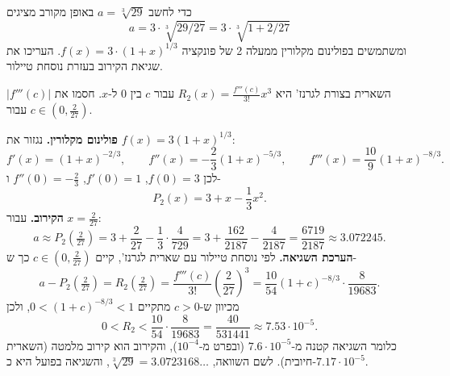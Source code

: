
\begin{question}
כדי לחשב $a=\sqrt[3]{29}$ באופן מקורב מציגים
\[ a=3\cdot\sqrt[3]{29/27}=3\cdot\sqrt[3]{1+2/27} \]
ומשתמשים בפולינום מקלורין ממעלה 2 של פונקציה $f(x)=3\cdot(1+x)^{1/3}$. העריכו את שגיאת הקירוב בעזרת נוסחת טיילור.
\end{question}

\begin{hint}
השארית בצורת לגרנז' היא $R_2(x)=\frac{f'''(c)}{3!}x^3$ עבור $c$ בין $0$ ל-$x$. חסמו את $|f'''(c)|$ עבור $c\in(0,\frac2{27})$.
\end{hint}

\begin{solution}
\textbf{פולינום מקלורין.} נגזור את $f(x)=3(1+x)^{1/3}$:
\[ f'(x)=(1+x)^{-2/3},\qquad f''(x)=-\frac23(1+x)^{-5/3},\qquad f'''(x)=\frac{10}{9}(1+x)^{-8/3}. \]
לכן $f(0)=3$, $f'(0)=1$, $f''(0)=-\frac23$ ו-
\[ P_2(x)=3+x-\frac13x^2. \]
\textbf{הקירוב.} עבור $x=\frac2{27}$:
\[ a\approx P_2\!\left(\tfrac2{27}\right)=3+\frac2{27}-\frac13\cdot\frac{4}{729}=3+\frac{162}{2187}-\frac{4}{2187}=\frac{6719}{2187}\approx3.072245. \]
\textbf{הערכת השגיאה.} לפי נוסחת טיילור עם שארית לגרנז', קיים $c\in(0,\frac2{27})$ כך ש-
\[ a-P_2\!\left(\tfrac2{27}\right)=R_2\!\left(\tfrac2{27}\right)=\frac{f'''(c)}{3!}\left(\frac2{27}\right)^3=\frac{10}{54}(1+c)^{-8/3}\cdot\frac{8}{19683}. \]
מכיוון ש-$c>0$ מתקיים $0<(1+c)^{-8/3}<1$, ולכן
\[ 0<R_2<\frac{10}{54}\cdot\frac{8}{19683}=\frac{40}{531441}\approx7.53\cdot10^{-5}. \]
כלומר השגיאה קטנה מ-$7.6\cdot10^{-5}$ (ובפרט מ-$10^{-4}$), והקירוב הוא קירוב מלמטה (השארית חיובית). לשם השוואה, $\sqrt[3]{29}=3.0723168\ldots$, והשגיאה בפועל היא כ-$7.17\cdot10^{-5}$.
\end{solution}
